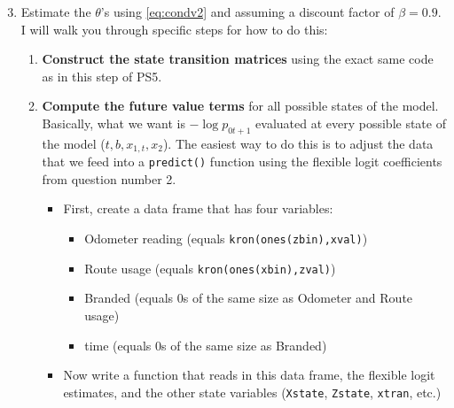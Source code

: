 \documentclass[12pt,english]{article}
\begin{document}
\begin{enumerate}
\setcounter{enumi}{2}
\item Estimate the $\theta$'s using \eqref{eq:condv2} and assuming a discount factor of $\beta = 0.9$. I will walk you through specific steps for how to do this:
    \begin{enumerate}
        \item \textbf{Construct the state transition matrices} using the exact same code as in this step of PS5.
        
        \item \textbf{Compute the future value terms} for all possible states of the model. Basically, what we want is $-\log p_{0t+1}$ evaluated at every possible state of the model ($t,b,x_{1,t},x_2$). The easiest way to do this is to adjust the data that we feed into a \texttt{predict()} function using the flexible logit coefficients from question number 2.
        \begin{itemize}
            \item First, create a data frame that has four variables:
            \begin{itemize}
                \item Odometer reading (equals \texttt{kron(ones(zbin),xval)})
                \item Route usage (equals \texttt{kron(ones(xbin),zval)})
                \item Branded (equals 0s of the same size as Odometer and Route usage)
                \item time (equals 0s of the same size as Branded)
            \end{itemize}
            
            \item Now write a function that reads in this data frame, the flexible logit estimates, and the other state variables (\texttt{Xstate}, \texttt{Zstate}, \texttt{xtran}, etc.)
            

\end{itemize}
\end{enumerate}
\end{enumerate}
\end{document}

